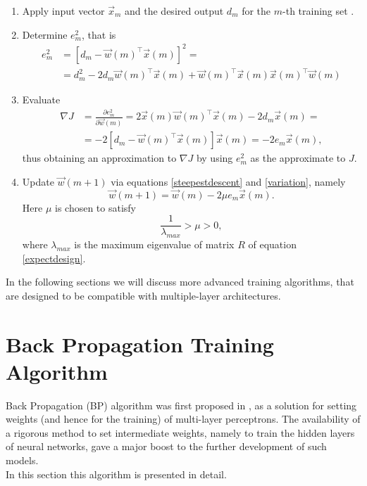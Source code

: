 \documentclass[%
    corpo=11pt,
    twoside,
    stile=classica,
    oldstyle,
    autoretitolo,
    tipotesi=magistrale,
    greek,
    evenboxes,
    english
]{toptesi}
\begin{document}
\begin{enumerate}
\item Apply input vector $\vec{x}_m$ and the desired output $d_m$ for the $m$-th training set .
\item Determine $e_m^2$, that is
\begin{align}
e_m^2  &= \left[d_m - \vec{w}(m)^{\intercal}\vec{x}(m) \right]^2 =  \\ 
& = d_m^2 -2d_m\vec{w}(m)^{\intercal}\vec{x}(m) + \vec{w}(m)^{\intercal}\vec{x}(m)\vec{x}(m)^{\intercal}\vec{w}(m)
\end{align}

\item Evaluate
\begin{align}
\nabla J &= \frac{\partial e_m^2}{\partial \vec{w}(m)} = 2\vec{x}(m)\vec{w}(m)^{\intercal}\vec{x}(m) - 2d_m\vec{x}(m) = \\
		&= -2\left[d_m - \vec{w}(m)^{\intercal}\vec{x}(m) \right]\vec{x}(m) = -2e_m\vec{x}(m),
\end{align}
thus obtaining an approximation to $\nabla J$ by using $e_m^2$ as the approximate to $J$.

\item Update $\vec{w}(m+1)$ via equations \eqref{steepestdescent} and \eqref{variation}, namely
\begin{equation}
\vec{w}(m+1) = \vec{w}(m) -2\mu e_m\vec{x}(m).
\end{equation}
Here $\mu$ is chosen to satisfy 
\begin{equation}
\frac{1}{\lambda_{max}} > \mu > 0,
\end{equation}
where $\lambda_{max}$ is the maximum eigenvalue of matrix $R$ of equation \eqref{expectdesign}.
\end{enumerate}
In the following sections we will discuss more advanced training algorithms, that are designed to be compatible with multiple-layer architectures.
\newpage
\section{Back Propagation Training Algorithm}
Back Propagation (BP) algorithm was first proposed in \cite{back}, as a solution for setting weights (and hence for the training) of multi-layer perceptrons. 
The availability of a rigorous method to set intermediate weights, namely to train the hidden layers of neural networks, gave a major boost to the further development of such models. \\
In this section this algorithm is presented in detail. \\
\end{document}
